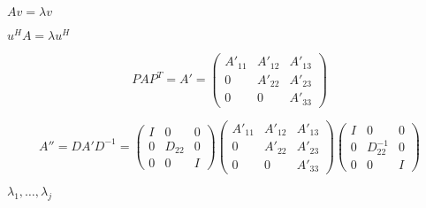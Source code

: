 {\newpage\clearpage
{}%
$Av = \lambda v$%
\lthtmlinlinemathZ
\lthtmlcheckvsize\clearpage}

{\newpage\clearpage
{}%
$u^H A = \lambda u^H$%
\lthtmlinlinemathZ
\lthtmlcheckvsize\clearpage}

{\newpage\clearpage
{}%
\begin{displaymath}
P A P^T = A'
 = \left( \begin{array}{ccc} A'_{11} & A'_{12} & A'_{13} \\
                              0    &  A'_{22} & A'_{23} \\
                              0   &   0     & A'_{33} \end{array} \right)
\end{displaymath}%
\lthtmldisplayZ
\lthtmlcheckvsize\clearpage}

{\newpage\clearpage
{}%
\begin{displaymath}
A'' = D A' D^{-1} = \left( \begin{array}{ccc} I & 0 & 0 \\
                                        0 & D_{22} & 0 \\
                                        0 & 0 & I \end{array} \right)
              \left( \begin{array}{ccc} A'_{11} & A'_{12} & A'_{13} \\
                                        0    &  A'_{22} & A'_{23} \\
                                        0   &   0  & A'_{33} \end{array} \right)
              \left( \begin{array}{ccc} I & 0 & 0 \\
                                        0 & D_{22}^{-1} & 0 \\
                                        0 & 0 & I \end{array} \right)
\end{displaymath}%
\lthtmldisplayZ
\lthtmlcheckvsize\clearpage}

{\newpage\clearpage
{}%
$\lambda_1 , \ldots , \lambda_j$%
\lthtmlinlinemathZ
\lthtmlcheckvsize\clearpage}

